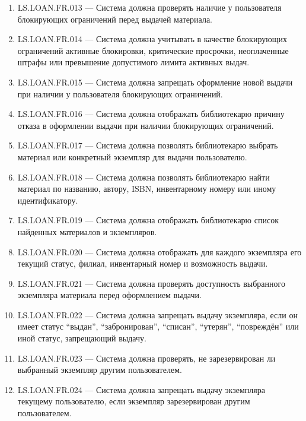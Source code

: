 \documentclass[12pt,a4paper]{article}
\begin{document}
\begin{enumerate}
		\item LS.LOAN.FR.013 --- Система должна проверять наличие у пользователя
		блокирующих ограничений перед выдачей материала.
		
		\item LS.LOAN.FR.014 --- Система должна учитывать в качестве блокирующих
		ограничений активные блокировки, критические просрочки, неоплаченные штрафы
		или превышение допустимого лимита активных выдач.
		
		\item LS.LOAN.FR.015 --- Система должна запрещать оформление новой выдачи при
		наличии у пользователя блокирующих ограничений.
		
		\item LS.LOAN.FR.016 --- Система должна отображать библиотекарю причину отказа
		в оформлении выдачи при наличии блокирующих ограничений.
		
		\item LS.LOAN.FR.017 --- Система должна позволять библиотекарю выбрать материал
		или конкретный экземпляр для выдачи пользователю.
		
		\item LS.LOAN.FR.018 --- Система должна позволять библиотекарю найти материал
		по названию, автору, ISBN, инвентарному номеру или иному идентификатору.
		
		\item LS.LOAN.FR.019 --- Система должна отображать библиотекарю список найденных
		материалов и экземпляров.
		
		\item LS.LOAN.FR.020 --- Система должна отображать для каждого экземпляра его
		текущий статус, филиал, инвентарный номер и возможность выдачи.
		
		\item LS.LOAN.FR.021 --- Система должна проверять доступность выбранного
		экземпляра материала перед оформлением выдачи.
		
		\item LS.LOAN.FR.022 --- Система должна запрещать выдачу экземпляра, если он
		имеет статус ``выдан'', ``забронирован'', ``списан'', ``утерян'', ``повреждён''
		или иной статус, запрещающий выдачу.
		
		\item LS.LOAN.FR.023 --- Система должна проверять, не зарезервирован ли выбранный
		экземпляр другим пользователем.
		
		\item LS.LOAN.FR.024 --- Система должна запрещать выдачу экземпляра текущему
		пользователю, если экземпляр зарезервирован другим пользователем.
		

\end{enumerate}
\end{document}
